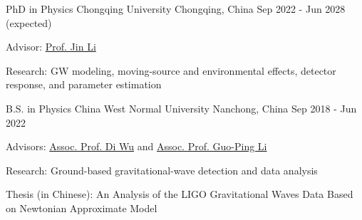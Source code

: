 

\begin{cventries}

  \cventry
    {PhD in Physics} %
    {Chongqing University} %
    {Chongqing, China}%
    {Sep 2022 - Jun 2028 (expected)} %
    {
      \begin{cvitems} %
        \item{Advisor: \href{https://inspirehep.net/authors/1456898?ui-citation-summary=true&ui-exclude-self-citations=true}{Prof. Jin Li}}
        \item{Research: GW modeling, moving-source and environmental effects, detector response, and parameter estimation}
      \end{cvitems}
    }

  \cventry
    {B.S. in Physics} %
    {China West Normal University} %
    {Nanchong, China}%
    {Sep 2018 - Jun 2022} %
    {
      \begin{cvitems} %
        \item{Advisors: \href{https://inspirehep.net/authors/1647692?ui-citation-summary=true&ui-exclude-self-citations=true}{Assoc. Prof. Di Wu} and \href{https://inspirehep.net/authors/1275221?ui-citation-summary=true&ui-exclude-self-citations=true}{Assoc. Prof. Guo-Ping Li}}
        \item{Research: Ground-based gravitational-wave detection and data analysis}
        \item{Thesis (in Chinese): An Analysis of the LIGO Gravitational Waves Data Based on Newtonian Approximate Model}
      \end{cvitems}
    }

\end{cventries}
